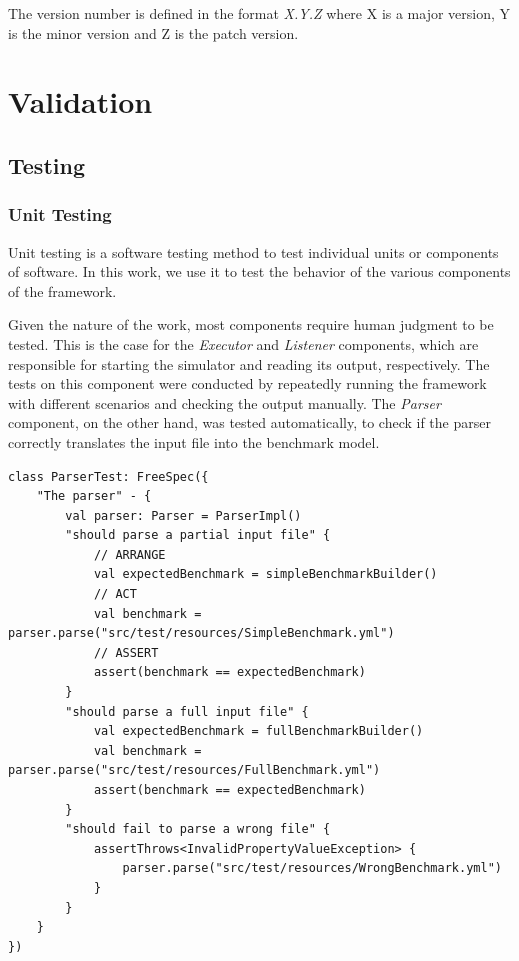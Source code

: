 \documentclass[12pt,a4paper,openright,twoside]{book}
\begin{document}
The version number is defined in the format \emph{X.Y.Z} where X is a major version, Y is the minor version and Z is the patch version.

\chapter{Validation}

\section{Testing}

\subsection*{Unit Testing}
Unit testing is a software testing method to test individual units or components of software.
In this work, we use it to test the behavior of the various components of the framework.

Given the nature of the work, most components require human judgment to be tested. 
This is the case for the \emph{Executor} and \emph{Listener} components, which are responsible for starting the simulator and reading its output, respectively.
The tests on this component were conducted by repeatedly running the framework with different scenarios and checking the output manually.
The \emph{Parser} component, on the other hand, was tested automatically, to check if the parser correctly translates the input file into the benchmark model.

\begin{lstlisting}[style=my-kotlin, language=my-kotlin, caption={Parser tests}]
  class ParserTest: FreeSpec({
    "The parser" - {
        val parser: Parser = ParserImpl()
        "should parse a partial input file" {
            // ARRANGE
            val expectedBenchmark = simpleBenchmarkBuilder()
            // ACT
            val benchmark = parser.parse("src/test/resources/SimpleBenchmark.yml")
            // ASSERT
            assert(benchmark == expectedBenchmark)
        }
        "should parse a full input file" {
            val expectedBenchmark = fullBenchmarkBuilder()
            val benchmark = parser.parse("src/test/resources/FullBenchmark.yml")
            assert(benchmark == expectedBenchmark)
        }
        "should fail to parse a wrong file" {
            assertThrows<InvalidPropertyValueException> {
                parser.parse("src/test/resources/WrongBenchmark.yml")
            }
        }
    }
})
\end{lstlisting}
\end{document}
